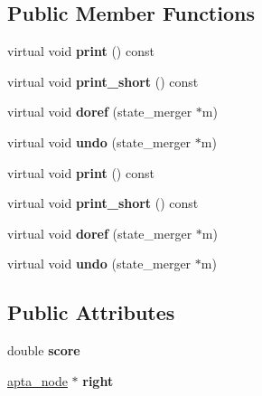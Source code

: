 \subsection*{Public Member Functions}
\begin{DoxyCompactItemize}
\item 
virtual void {\bfseries print} () const \hypertarget{classrefinement_a0ee933176436975fb05a2edb04ebd819}{}\label{classrefinement_a0ee933176436975fb05a2edb04ebd819}

\item 
virtual void {\bfseries print\+\_\+short} () const \hypertarget{classrefinement_a46046c9842832db4cd5a9310972dd898}{}\label{classrefinement_a46046c9842832db4cd5a9310972dd898}

\item 
virtual void {\bfseries doref} (state\+\_\+merger $\ast$m)\hypertarget{classrefinement_a3927f962be48969209071fff60a92e6d}{}\label{classrefinement_a3927f962be48969209071fff60a92e6d}

\item 
virtual void {\bfseries undo} (state\+\_\+merger $\ast$m)\hypertarget{classrefinement_a77bfd65c7d57546bfeb04ba7dacbf066}{}\label{classrefinement_a77bfd65c7d57546bfeb04ba7dacbf066}

\item 
virtual void {\bfseries print} () const \hypertarget{classrefinement_af49fa4a662bf1e70b10263f09fbd9815}{}\label{classrefinement_af49fa4a662bf1e70b10263f09fbd9815}

\item 
virtual void {\bfseries print\+\_\+short} () const \hypertarget{classrefinement_ad4bf879b18d00055d497fd7cff285933}{}\label{classrefinement_ad4bf879b18d00055d497fd7cff285933}

\item 
virtual void {\bfseries doref} (state\+\_\+merger $\ast$m)\hypertarget{classrefinement_a25db5c058abbc726958cbb281ef11456}{}\label{classrefinement_a25db5c058abbc726958cbb281ef11456}

\item 
virtual void {\bfseries undo} (state\+\_\+merger $\ast$m)\hypertarget{classrefinement_ab3d77f5214321dffd44c36445fe0e5eb}{}\label{classrefinement_ab3d77f5214321dffd44c36445fe0e5eb}

\end{DoxyCompactItemize}
\subsection*{Public Attributes}
\begin{DoxyCompactItemize}
\item 
double {\bfseries score}\hypertarget{classrefinement_a024cfbac56c02c168736c38f17f0a197}{}\label{classrefinement_a024cfbac56c02c168736c38f17f0a197}

\item 
\hyperlink{classapta__node}{apta\+\_\+node} $\ast$ {\bfseries right}\hypertarget{classrefinement_a704aab10cc3cad2704aa3fe054f66e2e}{}\label{classrefinement_a704aab10cc3cad2704aa3fe054f66e2e}

\end{DoxyCompactItemize}



